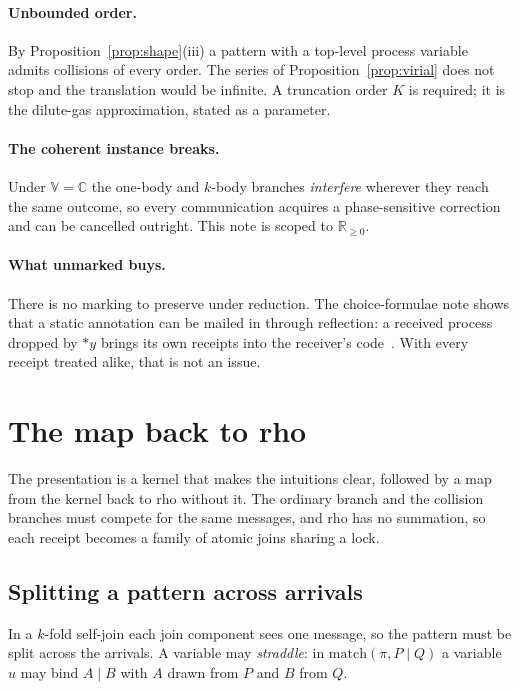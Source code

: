 \documentclass[11pt,a4paper]{article}
\theoremstyle{plain}
\theoremstyle{definition}
\theoremstyle{remark}
\newcommand{\rhoc}{\textsf{rho}}
\newcommand{\V}{\mathbb{V}}
\newcommand{\Rnn}{\mathbb{R}_{\geq 0}}
\newcommand{\Cx}{\mathbb{C}}
\newcommand{\match}{\mathrm{match}}
\begin{document}
\paragraph{Unbounded order.}
By Proposition~\ref{prop:shape}(iii) a pattern with a top-level process
variable admits collisions of every order. The series of
Proposition~\ref{prop:virial} does not stop and the translation would be
infinite. A truncation order $K$ is required; it is the dilute-gas
approximation, stated as a parameter.

\paragraph{The coherent instance breaks.}
Under $\V=\Cx$ the one-body and $k$-body branches \emph{interfere} wherever
they reach the same outcome, so every communication acquires a phase-sensitive
correction and can be cancelled outright. This note is scoped to $\Rnn$.

\paragraph{What unmarked buys.}
There is no marking to preserve under reduction. The choice-formulae note shows
that a static annotation can be mailed in through reflection: a received
process dropped by $*y$ brings its own receipts into the receiver's
code~\cite{CF}. With every receipt treated alike, that is not an issue.

\section{The map back to rho}\label{sec:translation}

The presentation is a kernel that makes the intuitions clear, followed by a map
from the kernel back to \rhoc{} without it. The ordinary branch and the
collision branches must compete for the same messages, and \rhoc{} has no
summation, so each receipt becomes a family of atomic joins sharing a lock.

\subsection{Splitting a pattern across arrivals}

In a $k$-fold self-join each join component sees one message, so the pattern
must be split across the arrivals. A variable may \emph{straddle}: in
$\match(\pi, P\mid Q)$ a variable $u$ may bind $A\mid B$ with $A$ drawn from
$P$ and $B$ from $Q$.
\end{document}
